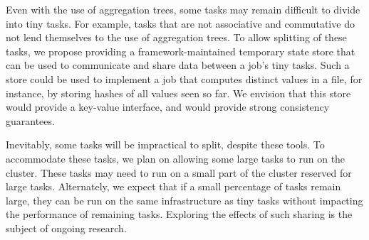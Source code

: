 Even with the use of aggregation trees, some tasks may remain difficult to
divide into tiny tasks. For example, tasks that are not associative and
commutative do not lend themselves to the use of aggregation trees.
To allow splitting of these tasks, we propose providing a framework-maintained
temporary state store that can be used to communicate and share data between a
job's tiny tasks. Such a store could be used to implement a job that computes
distinct values in a file, for instance, by storing hashes of all values
seen so far. We envision that this store would provide a key-value interface,
and would provide strong consistency guarantees.


Inevitably, some tasks will be impractical to split, despite these tools.
To accommodate these
tasks, we plan on allowing some large tasks to run on the cluster. These tasks
may need to run on a small part of the cluster reserved for large tasks.
Alternately, we expect that if a small percentage of tasks remain large, they
can be run on the same infrastructure as tiny tasks without impacting the
performance of remaining tasks. Exploring the effects of such sharing is
the subject of ongoing research.

